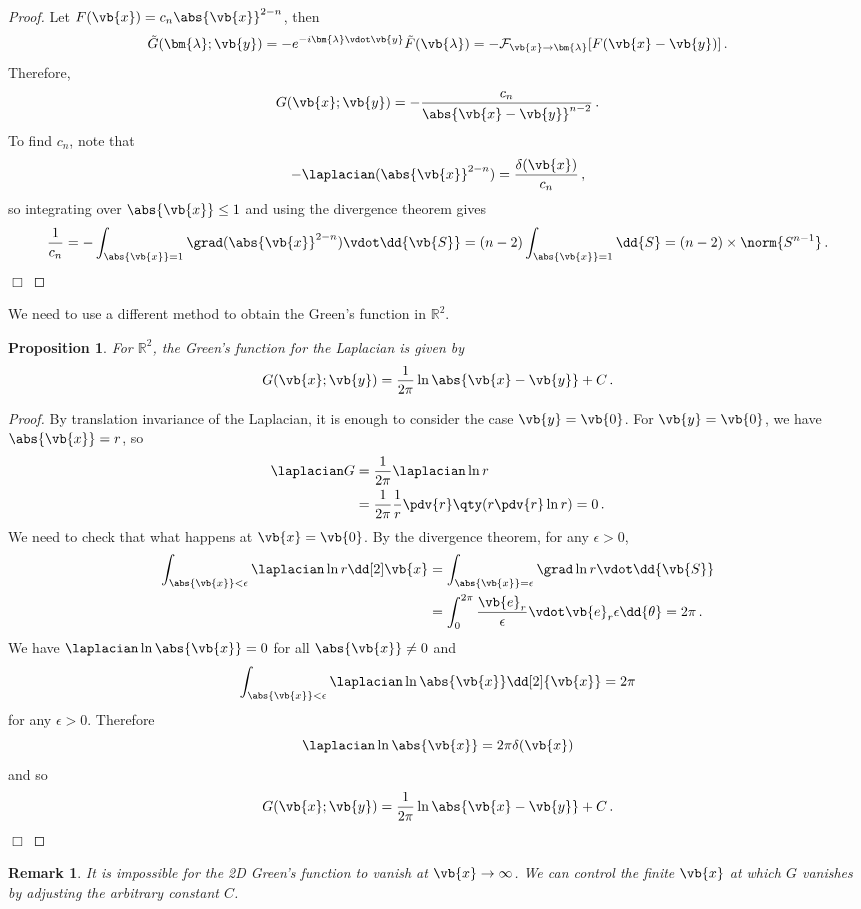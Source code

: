 \documentclass{article}
\theoremstyle{plain}\theoremheaderfont{\normalfont\itshape}\theorembodyfont{\rmfamily}\theoremseparator{.}\newtheorem*{rem}{Remark}\newtheorem*{ex}{Example}\newtheorem*{proof}{Proof}\newtheorem*{altp}{Alternative proof}
\theoremstyle{plain}\theoremheaderfont{\normalfont\bfseries}\theorembodyfont{\rmfamily}\theoremseparator{.}\newtheorem{thm}{Theorem}[section]\newtheorem{lem}[thm]{Lemma}\newtheorem{prop}[thm]{Proposition}\newtheorem*{cor}{Corollary}\newtheorem{defn}[thm]{Definition}\newtheorem{clm}[thm]{Claim}\newtheorem{clminproof}{Claim}
\theoremstyle{break}\theoremheaderfont{\normalfont\itshape}\theorembodyfont{\rmfamily}\theoremseparator{.\medskip}\newtheorem*{proofskip}{Proof}\newtheorem*{exs}{Examples}\newtheorem*{rems}{Remarks}
\theoremstyle{break}\theoremheaderfont{\normalfont\bfseries}\theorembodyfont{\rmfamily}\theoremseparator{.\medskip}\newtheorem{lemskip}[thm]{Lemma}\newtheorem{defnskip}[thm]{Definition}\newtheorem{propskip}[thm]{Proposition}\newtheorem{thmskip}[thm]{Theorem}
\numberwithin{equation}{section}
\newcommand{\qed}{\hfill\ensuremath{\Box}}
\newcommand{\bl}{\bm{\lambda}}
\begin{document}
	\begin{proof}
		Let \(F(\vb{x})=c_n\abs{\vb{x}}^{2-n}\), then
		\[\tilde{G}(\bl;\vb{y})=-e^{-i\bl\vdot\vb{y}}\tilde{F}(\vb{\lambda})=-\mathcal{F}_{\vb{x}\to\bl}[F(\vb{x}-\vb{y})]\,.\]
		Therefore,
		\[G(\vb{x};\vb{y})=-\frac{c_n}{\abs{\vb{x}-\vb{y}}^{n-2}}\,.\]
		To find \(c_n\), note that
		\[-\laplacian(\abs{\vb{x}}^{2-n})=\frac{\delta(\vb{x})}{c_n}\,,\]
		so integrating over \(\abs{\vb{x}}\le 1\) and using the divergence theorem gives
		\[\frac{1}{c_n}=-\int_{\abs{\vb{x}}=1}\grad(\abs{\vb{x}}^{2-n})\vdot\dd{\vb{S}}=(n-2)\int_{\abs{\vb{x}}=1}\dd{S}=(n-2)\times\norm{S^{n-1}}\,.\]\qed
	\end{proof}
	We need to use a different method to obtain the Green's function in \(\mathbb{R}^2\).
	\begin{prop}
		For \(\mathbb{R}^2\), the Green's function for the Laplacian is given by
		\[G(\vb{x};\vb{y})=\frac{1}{2\pi}\ln\abs{\vb{x}-\vb{y}}+C\,.\]
	\end{prop}
	\begin{proof}
		By translation invariance of the Laplacian, it is enough to consider the case \(\vb{y}=\vb{0}\). For \(\vb{y}=\vb{0}\), we have \(\abs{\vb{x}}=r\), so
		\begin{align*}
			\laplacian G&=\frac{1}{2\pi}\laplacian\ln r\\
			&=\frac{1}{2\pi}\frac{1}{r}\pdv{r}\qty(r\pdv{r}\ln r)=0\,.
		\end{align*}
		We need to check that what happens at \(\vb{x}=\vb{0}\). By the divergence theorem, for any \(\epsilon>0\),
		\begin{align*}
			\int_{\abs{\vb{x}}<\epsilon}\laplacian\ln r \dd[2]\vb{x}&=\int_{\abs{\vb{x}}=\epsilon}\grad\ln r\vdot\dd{\vb{S}}\\
			&=\int_{0}^{2\pi}\frac{\vb{e}_r}{\epsilon}\vdot\vb{e}_r\epsilon\dd{\theta}=2\pi\,.
		\end{align*}
		We have \(\laplacian\ln\abs{\vb{x}}=0\) for all \(\abs{\vb{x}}\ne 0\) and
		\[\int_{\abs{\vb{x}}<\epsilon}\laplacian\ln\abs{\vb{x}}\dd[2]{\vb{x}}=2\pi\]
		for any \(\epsilon>0\). Therefore
		\[\laplacian\ln\abs{\vb{x}}=2\pi\delta(\vb{x})\]
		and so
		\[G(\vb{x};\vb{y})=\frac{1}{2\pi}\ln\abs{\vb{x}-\vb{y}}+C\,.\]\qed
	\end{proof}
	\begin{rem}
		It is impossible for the 2D Green's function to vanish at \(\vb{x}\to\infty\). We can control the finite \(\vb{x}\) at which \(G\) vanishes by adjusting the arbitrary constant \(C\).
	\end{rem}
\end{document}
